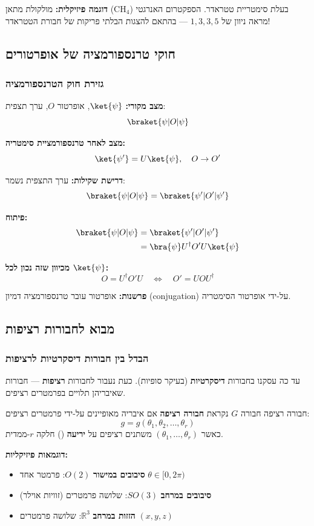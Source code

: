 \textbf{דוגמה פיזיקלית:} מולקולת מתאן (CH$_4$) בעלת סימטריית טטראדר. הספקטרום האנרגטי מראה ניוון של $1, 3, 3, 5$ — בהתאם להצגות הבלתי פריקות של חבורת הטטראדר!

\subsection{חוקי טרנספורמציה של אופרטורים}

\subsubsection{גזירת חוק הטרנספורמציה}

\textbf{מצב מקורי:} $\ket{\psi}$, אופרטור $O$, ערך תצפית:
\[
\braket{\psi | O | \psi}
\]

\textbf{מצב לאחר טרנספורמציית סימטריה:}
\[
\ket{\psi'} = U \ket{\psi}, \quad O \to O'
\]

\textbf{דרישת שקילות:} ערך התצפית נשמר:
\[
\braket{\psi | O | \psi} = \braket{\psi' | O' | \psi'}
\]

\textbf{פיתוח:}
\begin{align*}
\braket{\psi | O | \psi} &= \braket{\psi' | O' | \psi'} \\
&= \bra{\psi} U^\dagger O' U \ket{\psi}
\end{align*}

\textbf{מכיוון שזה נכון לכל $\ket{\psi}$:}
\[
\boxed{O = U^\dagger O' U \quad \Leftrightarrow \quad O' = U O U^\dagger}
\]

\textbf{פרשנות:} אופרטור עובר טרנספורמציה דמיון (conjugation) על-ידי אופרטור הסימטריה.

\subsection{מבוא לחבורות רציפות}

\subsubsection{הבדל בין חבורות דיסקרטיות לרציפות}

עד כה עסקנו בחבורות \textbf{דיסקרטיות} (בעיקר סופיות). כעת נעבור לחבורות \textbf{רציפות} — חבורות שאיבריהן תלויים בפרמטרים רציפים.

\begin{definitionbox}{חבורה רציפה}
חבורה $G$ נקראת \textbf{חבורה רציפה} אם איבריה מאופיינים על-ידי פרמטרים רציפים:
\[
g = g(\theta_1, \theta_2, \ldots, \theta_r)
\]
כאשר $(\theta_1, \ldots, \theta_r)$ משתנים רציפים על \textbf{יריעה} () חלקה $r$-ממדית.

\textbf{דוגמאות פיזיקליות:}
\begin{itemize}
    \item \textbf{סיבובים במישור} $O(2)$: פרמטר אחד $\theta \in [0, 2\pi)$
    \item \textbf{סיבובים במרחב} $SO(3)$: שלושה פרמטרים (זוויות אוילר)
    \item \textbf{הזזות במרחב} $\mathbb{R}^3$: שלושה פרמטרים $(x, y, z)$
\end{itemize}
\end{definitionbox}

